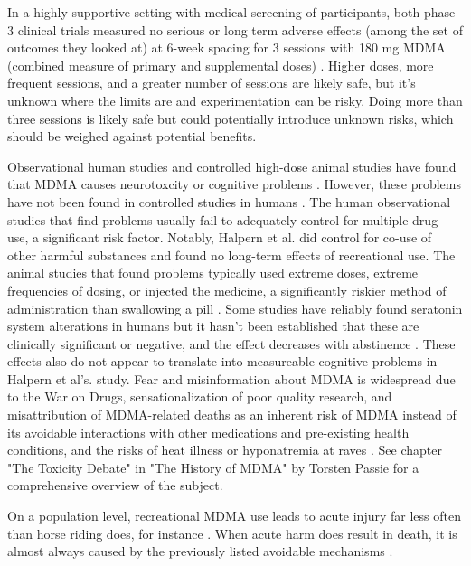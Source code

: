 \documentclass[12pt,letterpaper]{article}
\begin{document}
In a highly supportive setting with medical screening of participants, both phase 3 clinical trials measured no serious or long term adverse effects (among the set of outcomes they looked at) at 6-week spacing for 3 sessions with 180 mg MDMA (combined measure of primary and supplemental doses) \cite{mitchellMDMAClinicalTrial,mitchellMDMAClinicalTrial2}. Higher doses, more frequent sessions, and a greater number of sessions are likely safe, but it's unknown where the limits are and experimentation can be risky. Doing more than three sessions is likely safe but could potentially introduce unknown risks, which should be weighed against potential benefits.

Observational human studies and controlled high-dose animal studies have found that MDMA causes neurotoxcity or cognitive problems \cite{passieHistory}. However, these problems have not been found in controlled studies in humans \cite{halpernMormonRavers,mitchellMDMAClinicalTrial}. The human observational studies that find problems usually fail to adequately control for multiple-drug use, a significant risk factor. Notably, Halpern et al. did control for co-use of other harmful substances and found no long-term effects of recreational use. The animal studies that found problems typically used extreme doses, extreme frequencies of dosing, or injected the medicine, a significantly riskier method of administration than swallowing a pill \cite{passieHistory}. Some studies have reliably found seratonin system alterations in humans but it hasn't been established that these are clinically significant or negative, and the effect decreases with abstinence \cite{gouzoulis2006neurotoxicity}. These effects also do not appear to translate into measureable cognitive problems in Halpern et al's. study. Fear and misinformation about MDMA is widespread due to the War on Drugs, sensationalization of poor quality research, and misattribution of MDMA-related deaths as an inherent risk of MDMA instead of its avoidable interactions with other medications and pre-existing health conditions, and the risks of heat illness or hyponatremia at raves \cite{passieHistory}. See chapter "The Toxicity Debate" in "The History of MDMA" by Torsten Passie for a comprehensive overview of the subject.

On a population level, recreational MDMA use leads to acute injury far less often than horse riding does, for instance \cite{nutt2009equasy}. When acute harm does result in death, it is almost always caused by the previously listed avoidable mechanisms \cite{riggDeaths}.
\end{document}
